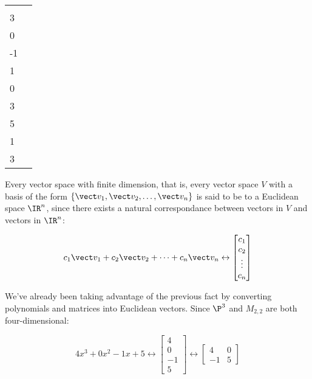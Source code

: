 \begin{applicationActivities}
\begin{activity}{10}
\begin{center}
\begin{tabular}{ll}
 &
     \(\vspan\left\{
    \begin{bmatrix}5\\3\\0\\-1\end{bmatrix},
    \begin{bmatrix}-2\\1\\0\\3\end{bmatrix},
    \begin{bmatrix}4\\5\\1\\3\end{bmatrix}
    \right\}
	\)
\end{tabular}
\end{center}
\end{activity}

\begin{fact}
  Every vector space with finite dimension, that is, every
  vector space \(V\) with a basis of the form
  \(\{\vect v_1,\vect v_2,\dots,\vect v_n\}\) is said to be
   to a Euclidean space \(\IR^n\), since there exists
  a natural correspondance between vectors in \(V\) and vectors in \(\IR^n\):

  \[
    c_1\vect v_1+c_2\vect v_2+\dots+c_n\vect v_n
    \leftrightarrow
    \begin{bmatrix}
      c_1\\c_2\\\vdots\\c_n
    \end{bmatrix}
  \]
\end{fact}

\begin{observation}
  We've already been taking advantage of the previous fact by converting
  polynomials and matrices into Euclidean vectors. Since \(\P^3\)
  and \(M_{2,2}\) are both four-dimensional:

  \[
    4x^3+0x^2-1x+5
    \leftrightarrow
    \begin{bmatrix}
      4\\0\\-1\\5
    \end{bmatrix}
    \leftrightarrow
    \begin{bmatrix}
      4&0\\-1&5
    \end{bmatrix}
  \]
\end{observation}


\end{applicationActivities}
